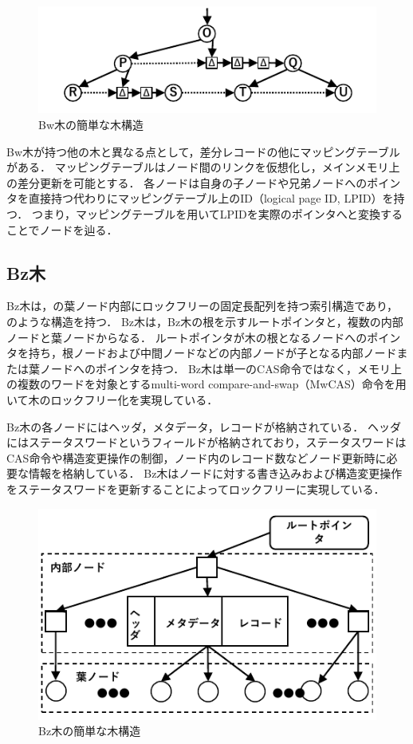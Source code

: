 \begin{figure}[t]
    \centering
    \includegraphics{./figures/simple_tree_structure_of_bw-tree.pdf}
    \caption{Bw木の簡単な木構造}
    \label{fig:simple_tree_structure_bw_tree}
\end{figure}

Bw木が持つ他の木と異なる点として，差分レコードの他にマッピングテーブルがある．
マッピングテーブルはノード間のリンクを仮想化し，メインメモリ上の差分更新を可能とする．
各ノードは自身の子ノードや兄弟ノードへのポインタを直接持つ代わりにマッピングテーブル上のID（logical page ID, LPID）を持つ．
つまり，マッピングテーブルを用いてLPIDを実際のポインタへと変換することでノードを辿る．

\subsection{Bz木}

Bz木は，\Bptree{}の葉ノード内部にロックフリーの固定長配列を持つ索引構造であり，\Fig{\ref{fig:simple_tree_structure_bztree}}のような構造を持つ．
Bz木は，Bz木の根を示すルートポインタと，複数の内部ノードと葉ノードからなる．
ルートポインタが木の根となるノードへのポインタを持ち，根ノードおよび中間ノードなどの内部ノードが子となる内部ノードまたは葉ノードへのポインタを持つ．
Bz木は単一のCAS命令ではなく，メモリ上の複数のワードを対象とするmulti-word compare-and-swap（MwCAS）命令を用いて木のロックフリー化を実現している．

Bz木の各ノードにはヘッダ，メタデータ，レコードが格納されている．
ヘッダにはステータスワードというフィールドが格納されており，ステータスワードはCAS命令や構造変更操作の制御，ノード内のレコード数などノード更新時に必要な情報を格納している．
Bz木はノードに対する書き込みおよび構造変更操作をステータスワードを更新することによってロックフリーに実現している．

\begin{figure}
    \centering
    \includegraphics{./figures/simple_tree_structure_of_bz-tree_fix.pdf}
    \caption{Bz木の簡単な木構造}
    \label{fig:simple_tree_structure_bztree}
\end{figure}


